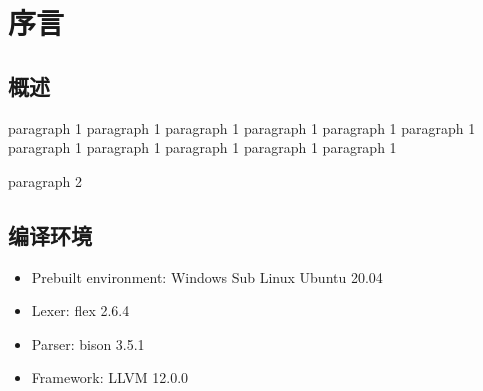 \documentclass{article}
\begin{document}
\newpage



\section*{序言}

\subsection*{概述}
\par paragraph 1 paragraph 1 paragraph 1 paragraph 1 paragraph 1 paragraph 1 paragraph 1 paragraph 1 paragraph 1 paragraph 1 paragraph 1 
\par paragraph 2

\subsection*{编译环境}
\begin{itemize}
    \item Prebuilt environment: Windows Sub Linux Ubuntu 20.04
    \item Lexer: flex 2.6.4
    \item Parser: bison 3.5.1
    \item Framework: LLVM 12.0.0
\end{itemize}
\end{document}
